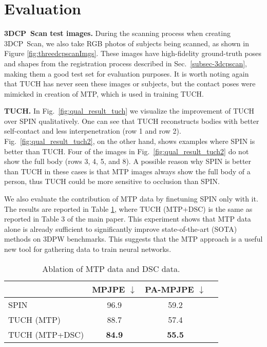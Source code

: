 \documentclass[final]{cvpr}
\newcommand{\threedcpscan}{\mbox{3DCP Scan}\xspace}
\theoremstyle{definition}
\begin{document}
\section{Evaluation}
\textbf{\threedcpscan test images.}
During the scanning process when creating \threedcpscan, we also take RGB photos of subjects being scanned, as shown in Figure \ref{fig:threedcpscanImgs}.
These images have high-fidelity ground-truth poses and shapes from the registration process described in Sec.~\ref{subsec-3dcpscan}, making them a good test set for evaluation purposes.
It is worth noting again that TUCH has never seen these images or subjects, but the contact poses were mimicked in creation of MTP, which is used in training TUCH.

\textbf{TUCH.} 
In Fig.~\ref{fig:qual_result_tuch} we visualize the improvement of TUCH over SPIN qualitatively. One can see that TUCH reconstructs bodies with better self-contact and less interpenetration (row 1 and row 2).
Fig.~\ref{fig:qual_result_tuch2}, on the other hand, shows examples where SPIN is better than TUCH. Four of the images in Fig.~\ref{fig:qual_result_tuch2} do not show the full body (rows 3, 4, 5, and 8). A possible reason why SPIN is better than TUCH in these cases is that MTP images always show the full body of a person, thus TUCH could be more sensitive to occlusion than SPIN. 

We also evaluate the contribution of MTP data by finetuning SPIN only
with it. 
The results are reported in Table \ref{supptab:mtp_only}, where TUCH
(MTP+DSC) is the same as reported in Table 3 of the main paper. This experiment shows
that MTP data alone is already sufficient to significantly improve
state-of-the-art (SOTA) methods on 3DPW benchmarks.
This suggests that the MTP approach is a useful new tool for gathering
data to train neural networks. 


\begin{table}
	\begin{center}
		\setlength{\extrarowheight}{2pt}
		\begin{tabular}{lccc}
			\toprule[1pt]
			&   MPJPE $\downarrow$ & PA-MPJPE $\downarrow$ \\ 
			\hline
			SPIN & 96.9 & 59.2 \\
			TUCH (MTP)  &  88.7         & 57.4         \\
			TUCH (MTP+DSC)  &  \textbf{84.9}         & \textbf{55.5}         \\
			\bottomrule[1pt]
		\end{tabular}
	\end{center}
	\caption{Ablation of MTP data and DSC data.}
	\label{supptab:mtp_only}
\end{table}
\end{document}

